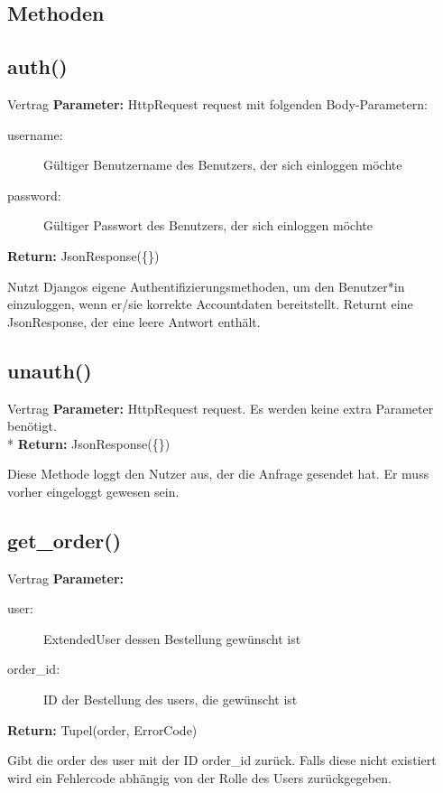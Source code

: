 \documentclass[12pt]{article}
\newcommand{\insetContract}{12pt}
\newcommand{\insetMethodDescription}{-0.7cm}
\begin{document}
\subsection{Methoden}
\enlargethispage*{0.5cm}

\subsection{auth()}
\begin{contract}{Vertrag}
    \textbf{Parameter:} HttpRequest request mit folgenden Body-Parametern:
    \begin{description}
        \item[\hspace{\insetContract} username:] Gültiger Benutzername des Benutzers, der sich einloggen möchte
        \item[\hspace{\insetContract} password:] Gültiger Passwort des Benutzers, der sich einloggen möchte
    \end{description}
    \textbf{Return:} JsonResponse(\{\})
    
\end{contract}
\hspace{\insetMethodDescription{}}
Nutzt Djangos eigene Authentifizierungsmethoden, um den Benutzer*in einzuloggen, wenn er/sie korrekte Accountdaten bereitstellt. Returnt eine JsonResponse, der eine leere Antwort enthält.


\subsection{unauth()}
\begin{contract}{Vertrag}
    \textbf{Parameter:} HttpRequest request. Es werden keine extra Parameter benötigt. \\*
    \textbf{Return:} JsonResponse(\{\})
\end{contract}
\hspace{\insetMethodDescription{}}
Diese Methode loggt den Nutzer aus, der die Anfrage gesendet hat. Er muss vorher eingeloggt gewesen sein. 


\subsection{get_order()}
\begin{contract}{Vertrag}
    \textbf{Parameter:} 
    \begin{description}
        \item[\hspace{\insetContract} user:] ExtendedUser dessen Bestellung gewünscht ist
        \item[\hspace{\insetContract} order_id:] ID der Bestellung des users, die gewünscht ist
    \end{description}
    \textbf{Return:} Tupel(order, ErrorCode)
\end{contract}
\hspace{\insetMethodDescription{}}
Gibt die order des user mit der ID order_id zurück. Falls diese nicht existiert wird ein Fehlercode abhängig von der Rolle des Users zurückgegeben.
\end{document}
